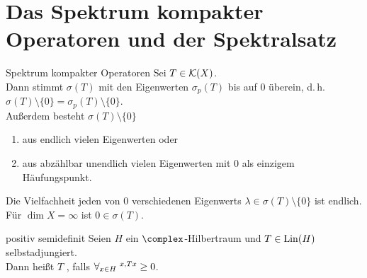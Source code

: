 \pagebreak

\section{%
    Das Spektrum kompakter Operatoren und der Spektralsatz%
}

\begin{Satz}{Spektrum kompakter Operatoren}
    Sei $T \in \mathcal{K}(X)$.\\
    Dann stimmt $\sigma(T)$ mit den Eigenwerten $\sigma_p(T)$ bis auf $0$ überein,
    d.\,h. $\sigma(T) \setminus \{0\} = \sigma_p(T) \setminus \{0\}$.\\
    Außerdem besteht $\sigma(T) \setminus \{0\}$
    \begin{enumerate}
        \item
        aus endlich vielen Eigenwerten oder

        \item
        aus abzählbar unendlich vielen Eigenwerten mit $0$ als einzigem Häufungspunkt.
    \end{enumerate}
    Die Vielfachheit jeden von $0$ verschiedenen Eigenwerts
    $\lambda \in \sigma(T) \setminus \{0\}$ ist endlich.\\
    Für $\dim X = \infty$ ist $0 \in \sigma(T)$.
\end{Satz}

\linie

\begin{Def}{positiv semidefinit}
    Seien $H$ ein $\complex$-Hilbertraum und $T \in \operatorname{Lin}(H)$ selbstadjungiert.\\
    Dann heißt $T$ , falls
    $\forall_{x \in H}\; \sp{x, Tx} \ge 0$.
\end{Def}


